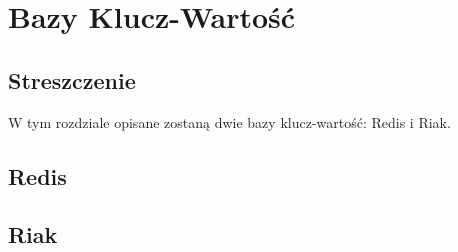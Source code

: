 \chapter{Bazy Klucz-Wartość}

\section*{Streszczenie}
W tym rozdziale opisane zostaną dwie bazy klucz-wartość: Redis i Riak.

\section{Redis}
\label{sec:redis}

\section{Riak}
\label{sec:riak}